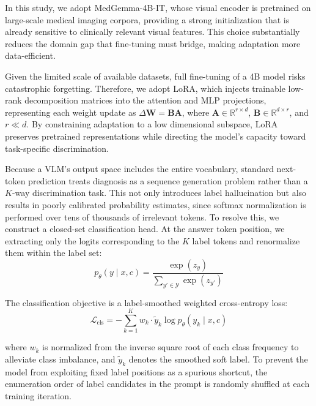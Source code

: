 \documentclass[preprint,12pt]{elsarticle}
\begin{document}
In this study, we adopt MedGemma-4B-IT, whose visual encoder is pretrained on large-scale medical imaging corpora, providing a strong initialization that is already sensitive to clinically relevant visual features. This choice substantially reduces the domain gap that fine-tuning must bridge, making adaptation more data-efficient.


Given the limited scale of available datasets, full fine-tuning of a 4B model risks catastrophic forgetting. 
Therefore, we adopt LoRA, which injects trainable low-rank decomposition matrices into the attention and MLP projections, representing each weight update as $\Delta \mathbf{W} = \mathbf{B}\mathbf{A}$, 
where $\mathbf{A} \in \mathbb{R}^{r \times d}$, $\mathbf{B} \in \mathbb{R}^{d \times r}$, 
and $r \ll d$. By constraining adaptation to a low dimensional subspace, LoRA preserves pretrained representations while directing the model's capacity toward task-specific discrimination.


Because a VLM's output space includes the entire vocabulary, standard next-token prediction treats diagnosis as 
a sequence generation problem rather than a $K$-way discrimination task. This not only introduces label hallucination 
but also results in poorly calibrated probability estimates, since softmax normalization is performed over tens of thousands
of irrelevant tokens. To 
resolve this, we construct a closed-set classification head.  At the answer token position, we extracting only the logits corresponding to the $K$ label tokens and renormalize them within the label set:
%
\begin{equation}
	p_\theta(y \mid x,c) 
	= \frac{\exp(z_{y})}{\sum_{y' \in \mathcal{Y}} \exp(z_{y'})}
	\label{eq:closed_softmax}
\end{equation}
%

The classification objective is a label-smoothed weighted cross-entropy loss:
%
\begin{equation}
	\mathcal{L}_{\mathrm{cls}} 
	= -\sum_{k=1}^{K} w_k \cdot \tilde{y}_k \log p_\theta(y_k \mid x,c)
	\label{eq:cls_loss}
\end{equation}

%
where $w_k$ is normalized from the inverse square root of each class frequency to alleviate class imbalance, and $\tilde{y}_k$ denotes the smoothed soft label. To prevent the model from exploiting fixed label positions as a spurious shortcut, the enumeration order of label candidates in the prompt is randomly shuffled at each training iteration.
\end{document}
